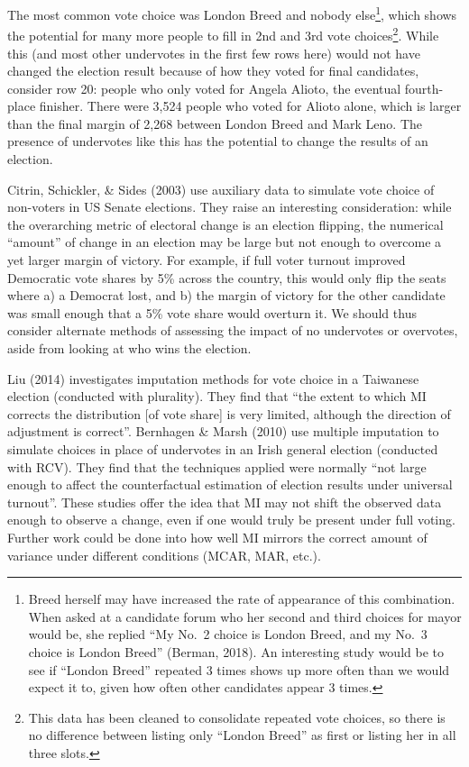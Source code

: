 \documentclass[12pt,twoside]{reedthesis}
\begin{document}
The most common vote choice was London Breed and nobody else\footnote{Breed herself may have increased the rate of appearance of this combination. When asked at a candidate forum who her second and third choices for mayor would be, she replied ``My No.~2 choice is London Breed, and my No.~3 choice is London Breed'' (Berman, 2018). An interesting study would be to see if ``London Breed'' repeated 3 times shows up more often than we would expect it to, given how often other candidates appear 3 times.}, which shows the potential for many more people to fill in 2nd and 3rd vote choices\footnote{This data has been cleaned to consolidate repeated vote choices, so there is no difference between listing only ``London Breed'' as first or listing her in all three slots.}. While this (and most other undervotes in the first few rows here) would not have changed the election result because of how they voted for final candidates, consider row 20: people who only voted for Angela Alioto, the eventual fourth-place finisher. There were 3,524 people who voted for Alioto alone, which is larger than the final margin of 2,268 between London Breed and Mark Leno. The presence of undervotes like this has the potential to change the results of an election.

Citrin, Schickler, \& Sides (2003) use auxiliary data to simulate vote choice of non-voters in US Senate elections. They raise an interesting consideration: while the overarching metric of electoral change is an election flipping, the numerical ``amount'' of change in an election may be large but not enough to overcome a yet larger margin of victory. For example, if full voter turnout improved Democratic vote shares by 5\% across the country, this would only flip the seats where a) a Democrat lost, and b) the margin of victory for the other candidate was small enough that a 5\% vote share would overturn it. We should thus consider alternate methods of assessing the impact of no undervotes or overvotes, aside from looking at who wins the election.

Liu (2014) investigates imputation methods for vote choice in a Taiwanese election (conducted with plurality). They find that ``the extent to which MI corrects the distribution {[}of vote share{]} is very limited, although the direction of adjustment is correct''. Bernhagen \& Marsh (2010) use multiple imputation to simulate choices in place of undervotes in an Irish general election (conducted with RCV). They find that the techniques applied were normally ``not large enough to affect the counterfactual estimation of election results under universal turnout''. These studies offer the idea that MI may not shift the observed data enough to observe a change, even if one would truly be present under full voting. Further work could be done into how well MI mirrors the correct amount of variance under different conditions (MCAR, MAR, etc.).
\end{document}
